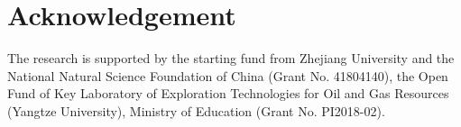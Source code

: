 \section{Acknowledgement}
The research is supported by the starting fund from Zhejiang University and the National Natural Science Foundation of China (Grant No. 41804140), the Open Fund of Key Laboratory of Exploration Technologies for Oil and Gas Resources (Yangtze University), Ministry of Education (Grant No. PI2018-02).































